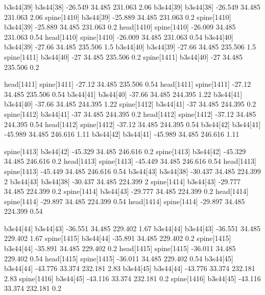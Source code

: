 b3s44[39]    b3s44[38]    -26.549    34.485    231.063    2.06
b3s44[39]    b3s44[38]    -26.549    34.485    231.063    2.06
spine[1410]    b3s44[39]    -25.889    34.485    231.063    0.2
spine[1410]    b3s44[39]    -25.889    34.485    231.063    0.2
head[1410]    spine[1410]    -26.009    34.485    231.063    0.54
head[1410]    spine[1410]    -26.009    34.485    231.063    0.54
b3s44[40]    b3s44[39]    -27.66    34.485    235.506    1.5
b3s44[40]    b3s44[39]    -27.66    34.485    235.506    1.5
spine[1411]    b3s44[40]    -27    34.485    235.506    0.2
spine[1411]    b3s44[40]    -27    34.485    235.506    0.2


head[1411]    spine[1411]    -27.12    34.485    235.506    0.54
head[1411]    spine[1411]    -27.12    34.485    235.506    0.54
b3s44[41]    b3s44[40]    -37.66    34.485    244.395    1.22
b3s44[41]    b3s44[40]    -37.66    34.485    244.395    1.22
spine[1412]    b3s44[41]    -37    34.485    244.395    0.2
spine[1412]    b3s44[41]    -37    34.485    244.395    0.2
head[1412]    spine[1412]    -37.12    34.485    244.395    0.54
head[1412]    spine[1412]    -37.12    34.485    244.395    0.54
b3s44[42]    b3s44[41]    -45.989    34.485    246.616    1.11
b3s44[42]    b3s44[41]    -45.989    34.485    246.616    1.11


spine[1413]    b3s44[42]    -45.329    34.485    246.616    0.2
spine[1413]    b3s44[42]    -45.329    34.485    246.616    0.2
head[1413]    spine[1413]    -45.449    34.485    246.616    0.54
head[1413]    spine[1413]    -45.449    34.485    246.616    0.54
b3s44[43]    b3s44[38]    -30.437    34.485    224.399    2
b3s44[43]    b3s44[38]    -30.437    34.485    224.399    2
spine[1414]    b3s44[43]    -29.777    34.485    224.399    0.2
spine[1414]    b3s44[43]    -29.777    34.485    224.399    0.2
head[1414]    spine[1414]    -29.897    34.485    224.399    0.54
head[1414]    spine[1414]    -29.897    34.485    224.399    0.54


b3s44[44]    b3s44[43]    -36.551    34.485    229.402    1.67
b3s44[44]    b3s44[43]    -36.551    34.485    229.402    1.67
spine[1415]    b3s44[44]    -35.891    34.485    229.402    0.2
spine[1415]    b3s44[44]    -35.891    34.485    229.402    0.2
head[1415]    spine[1415]    -36.011    34.485    229.402    0.54
head[1415]    spine[1415]    -36.011    34.485    229.402    0.54
b3s44[45]    b3s44[44]    -43.776    33.374    232.181    2.83
b3s44[45]    b3s44[44]    -43.776    33.374    232.181    2.83
spine[1416]    b3s44[45]    -43.116    33.374    232.181    0.2
spine[1416]    b3s44[45]    -43.116    33.374    232.181    0.2



